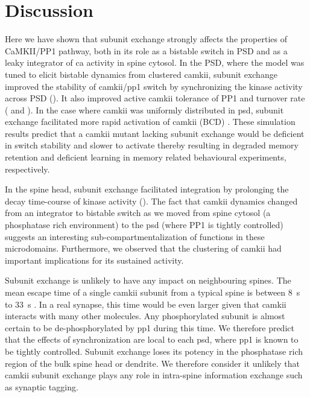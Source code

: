 \documentclass[9pt,lineno,doublespacing]{elife}
\begin{document}
\section{Discussion}\label{discussion}

Here we have shown that subunit exchange strongly affects the properties of
CaMKII/PP1 pathway, both in its role as a bistable switch in PSD and as a leaky
integrator of \gls{ca} activity in spine cytosol. In the PSD, where the model
was tuned to elicit bistable dynamics from clustered \gls{camkii}, subunit
exchange improved the stability of \gls{camkii}/\gls{pp1} switch by
synchronizing the kinase activity across PSD (). It also
improved active \gls{camkii} tolerance of PP1 and turnover rate
( and ). In the case where \gls{camkii} was
uniformly distributed in \gls{psd}, subunit exchange facilitated more rapid
activation of \gls{camkii} (BCD)
\citep{stratton_activation-triggered_2014}. These simulation results predict
that a \gls{camkii} mutant lacking subunit exchange would be deficient in switch
stability and slower to activate thereby resulting in degraded memory retention
and deficient learning in memory related behavioural experiments, respectively.

In the spine head, subunit exchange facilitated integration by prolonging the
decay time-course of kinase activity ().  The fact that
\gls{camkii} dynamics changed from an integrator to bistable switch as we moved
from spine cytosol (a phosphatase rich environment) to the \gls{psd} (where PP1
is tightly controlled) suggests an interesting sub-compartmentalization of
functions in these microdomains. Furthermore, we observed that the clustering of
\gls{camkii} had important implications for its sustained activity.

Subunit exchange is unlikely to have any impact on neighbouring spines. The mean
escape time of a single \gls{camkii} subunit from a typical spine is between
\SI{8}{\second} to \SI{33}{\second} \citep{holcman_diffusion_2011}. In a real
synapse, this time would be even larger given that \gls{camkii} interacts with
many other molecules. Any phosphorylated subunit is almost certain to be
de-phosphorylated by \gls{pp1} during this time. We therefore predict that the
effects of synchronization are local to each \gls{psd}, where \gls{pp1} is known
to be tightly controlled.  Subunit exchange loses its potency in the phosphatase
rich region of the bulk spine head or dendrite. We therefore consider it
unlikely that \gls{camkii} subunit exchange plays any role in intra-spine
information exchange such as synaptic tagging.
\end{document}
